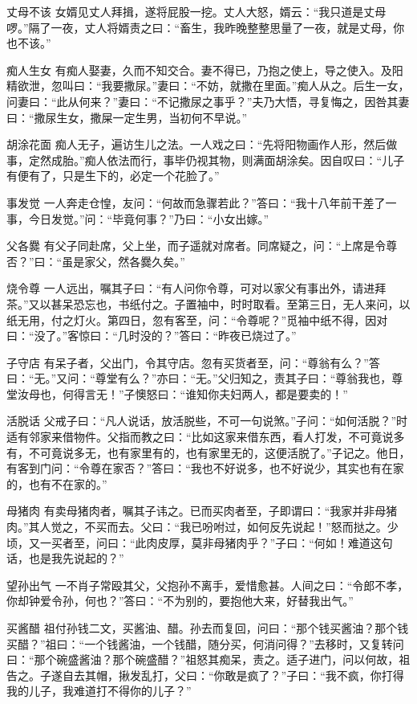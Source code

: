 \documentclass[12pt,UTF8]{ctexbook}
\begin{document}
丈母不该
女婿见丈人拜揖，遂将屁股一挖。丈人大怒，婿云：“我只道是丈母啰。”隔了一夜，丈人将婿责之曰：“畜生，我昨晚整整思量了一夜，就是丈母，你也不该。”

痴人生女
有痴人娶妻，久而不知交合。妻不得已，乃抱之使上，导之使入。及阳精欲泄，忽叫曰：“我要撒尿。”妻曰：“不妨，就撒在里面。”痴人从之。后生一女，问妻曰：“此从何来？”妻曰：“不记撒尿之事乎？”夫乃大悟，寻复悔之，因咎其妻曰：“撒尿生女，撒屎一定生男，当初何不早说。”

胡涂花面
痴人无子，遍访生儿之法。一人戏之曰：“先将阳物画作人形，然后做事，定然成胎。”痴人依法而行，事毕仍视其物，则满面胡涂矣。因自叹曰：“儿子有便有了，只是生下的，必定一个花脸了。”

事发觉
一人奔走仓惶，友问：“何故而急骤若此？”答曰：“我十八年前干差了一事，今日发觉。”问：“毕竟何事？”乃曰：“小女出嫁。”

父各爨
有父子同赴席，父上坐，而子遥就对席者。同席疑之，问：“上席是令尊否？”曰：“虽是家父，然各爨久矣。”

烧令尊
一人远出，嘱其子曰：“有人问你令尊，可对以家父有事出外，请进拜茶。”又以甚呆恐忘也，书纸付之。子置袖中，时时取看。至第三日，无人来问，以纸无用，付之灯火。第四日，忽有客至，问：“令尊呢？”觅袖中纸不得，因对曰：“没了。”客惊曰：“几时没的？”答曰：“昨夜已烧过了。”

子守店
有呆子者，父出门，令其守店。忽有买货者至，问：“尊翁有么？”答曰：“无。”又问：“尊堂有么？”亦曰：“无。”父归知之，责其子曰：“尊翁我也，尊堂汝母也，何得言无！”子懊怒曰：“谁知你夫妇两人，都是要卖的！”

活脱话
父戒子曰：“凡人说话，放活脱些，不可一句说煞。”子问：“如何活脱？”时适有邻家来借物件。父指而教之曰：“比如这家来借东西，看人打发，不可竟说多有，不可竟说多无，也有家里有的，也有家里无的，这便活脱了。”子记之。他日，有客到门问：“令尊在家否？”答曰：“我也不好说多，也不好说少，其实也有在家的，也有不在家的。”

母猪肉
有卖母猪肉者，嘱其子讳之。已而买肉者至，子即谓曰：“我家并非母猪肉。”其人觉之，不买而去。父曰：“我已吩咐过，如何反先说起！”怒而挞之。少顷，又一买者至，问曰：“此肉皮厚，莫非母猪肉乎？”子曰：“何如！难道这句话，也是我先说起的？”

望孙出气
一不肖子常殴其父，父抱孙不离手，爱惜愈甚。人间之曰：“令郎不孝，你却钟爱令孙，何也？”答曰：“不为别的，要抱他大来，好替我出气。”

买酱醋
祖付孙钱二文，买酱油、醋。孙去而复回，问曰：“那个钱买酱油？那个钱买醋？”祖曰：“一个钱酱油，一个钱醋，随分买，何消问得？”去移时，又复转问曰：“那个碗盛酱油？那个碗盛醋？”祖怒其痴呆，责之。适子进门，问以何故，祖告之。子遂自去其帽，揪发乱打，父曰：“你敢是疯了？”子曰：“我不疯，你打得我的儿子，我难道打不得你的儿子？”
\end{document}

